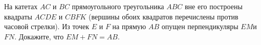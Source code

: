\begin{ex}
	\begin{condition}
		На катетах \( AC \) и \( BC \) прямоугольного треугольника \( ABC  \) вне его построены квадраты \( ACDE  \) и \( CBFK  \) (вершины	обоих квадратов перечислены против часовой стрелки). Из точек \( E  \) и \( F  \) на прямую \( AB  \) опущен перпендикуляры \( EM  \)и \( FN  \). Докажите, что \( EM + FN = AB \).
	\end{condition}
\end{ex}